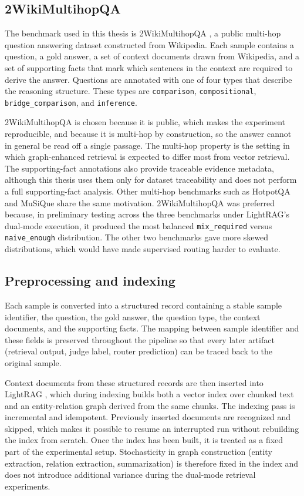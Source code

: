 \documentclass[english, bibtex]{kththesis}               %
\numberwithin{listing}{chapter}
\begin{document}
\subsection{2WikiMultihopQA}
\label{sec:method2wiki}

The benchmark used in this thesis is 2WikiMultihopQA \cite{ho2020twowiki}, a public multi-hop question answering dataset constructed from Wikipedia. Each sample contains a question, a gold answer, a set of context documents drawn from Wikipedia, and a set of supporting facts that mark which sentences in the context are required to derive the answer. Questions are annotated with one of four types that describe the reasoning structure. These types are \texttt{comparison}, \texttt{compositional}, \texttt{bridge\_comparison}, and \texttt{inference}.

2WikiMultihopQA is chosen because it is public, which makes the experiment reproducible, and because it is multi-hop by construction, so the answer cannot in general be read off a single passage. The multi-hop property is the setting in which graph-enhanced retrieval is expected to differ most from vector retrieval. The supporting-fact annotations also provide traceable evidence metadata, although this thesis uses them only for dataset traceability and does not perform a full supporting-fact analysis. Other multi-hop benchmarks such as HotpotQA and MuSiQue \cite{yang2018hotpotqa,trivedi2022musique} share the same motivation. 2WikiMultihopQA was preferred because, in preliminary testing across the three benchmarks under LightRAG's dual-mode execution, it produced the most balanced \texttt{mix\_required} versus \texttt{naive\_enough} distribution. The other two benchmarks gave more skewed distributions, which would have made supervised routing harder to evaluate.

\subsection{Preprocessing and indexing}
\label{sec:methodPreprocessing}

Each sample is converted into a structured record containing a stable sample identifier, the question, the gold answer, the question type, the context documents, and the supporting facts. The mapping between sample identifier and these fields is preserved throughout the pipeline so that every later artifact (retrieval output, judge label, router prediction) can be traced back to the original sample.

Context documents from these structured records are then inserted into LightRAG \cite{lightrag2024}, which during indexing builds both a vector index over chunked text and an entity-relation graph derived from the same chunks. The indexing pass is incremental and idempotent. Previously inserted documents are recognized and skipped, which makes it possible to resume an interrupted run without rebuilding the index from scratch. Once the index has been built, it is treated as a fixed part of the experimental setup. Stochasticity in graph construction (entity extraction, relation extraction, summarization) is therefore fixed in the index and does not introduce additional variance during the dual-mode retrieval experiments.
\end{document}
